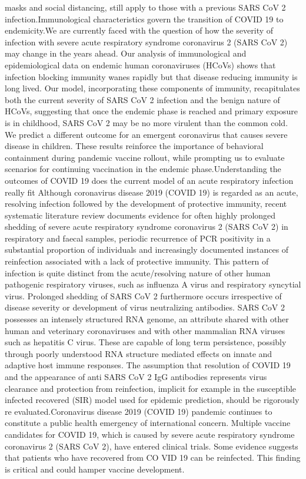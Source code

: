 \documentclass{qqtarticle}
\begin{document}
masks and social distancing, still apply to those with a previous SARS CoV 2 infection.Immunological characteristics govern the transition of COVID 19 to endemicity.We are currently faced with the question of how the severity of infection with severe acute respiratory syndrome coronavirus 2 (SARS CoV 2) may change in the years ahead. Our analysis of immunological and epidemiological data on endemic human coronaviruses (HCoVs) shows that infection blocking immunity wanes rapidly but that disease reducing immunity is long lived. Our model, incorporating these components of immunity, recapitulates both the current severity of SARS CoV 2 infection and the benign nature of HCoVs, suggesting that once the endemic phase is reached and primary exposure is in childhood, SARS CoV 2 may be no more virulent than the common cold. We predict a different outcome for an emergent coronavirus that causes severe disease in children. These results reinforce the importance of behavioral containment during pandemic vaccine rollout, while prompting us to evaluate scenarios for continuing vaccination in the endemic phase.Understanding the outcomes of COVID 19   does the current model of an acute respiratory infection really fit Although coronavirus disease 2019 (COVID 19) is regarded as an acute, resolving infection followed by the development of protective immunity, recent systematic literature review documents evidence for often highly prolonged shedding of severe acute respiratory syndrome coronavirus 2 (SARS CoV 2) in respiratory and faecal samples, periodic recurrence of PCR positivity in a substantial proportion of individuals and increasingly documented instances of reinfection associated with a lack of protective immunity. This pattern of infection is quite distinct from the acute/resolving nature of other human pathogenic respiratory viruses, such as influenza A virus and respiratory syncytial virus. Prolonged shedding of SARS CoV 2 furthermore occurs irrespective of disease severity or development of virus neutralizing antibodies. SARS CoV 2 possesses an intensely structured RNA genome, an attribute shared with other human and veterinary coronaviruses and with other mammalian RNA viruses such as hepatitis C virus. These are capable of long term persistence, possibly through poorly understood RNA structure mediated effects on innate and adaptive host immune responses. The assumption that resolution of COVID 19 and the appearance of anti SARS CoV 2 IgG antibodies represents virus clearance and protection from reinfection, implicit for example in the susceptible infected recovered (SIR) model used for epidemic prediction, should be rigorously re evaluated.Coronavirus disease 2019 (COVID 19) pandemic continues to constitute a public health emergency of international concern. Multiple vaccine candidates for COVID 19, which is caused by severe acute respiratory syndrome coronavirus 2 (SARS CoV 2), have entered clinical trials. Some evidence suggests that patients who have recovered from CO VID 19 can be reinfected. This finding is critical and could hamper vaccine development.
\end{document}

